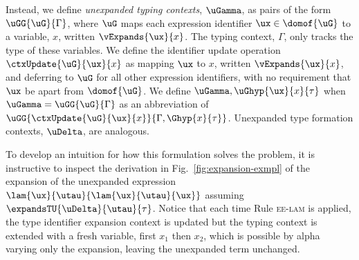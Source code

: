 \documentclass[acmsmall]{acmart}
\begin{document}
Instead, we define \emph{unexpanded typing contexts}, $\uGamma$, as pairs of the form $\uGG{\uG}{\Gamma}$, where $\uG$ maps each expression identifier $\ux \in \domof{\uG}$ to a variable, $x$, written $\vExpands{\ux}{x}$. The typing context, $\Gamma$, only tracks the type of these variables. We define the identifier update operation $\ctxUpdate{\uG}{\ux}{x}$ as mapping $\ux$ to $x$, written $\vExpands{\ux}{x}$, and deferring to $\uG$ for all other expression identifiers, with no requirement that $\ux$ be apart from $\domof{\uG}$. %
We define $\uGamma, \uGhyp{\ux}{x}{\tau}$ when $\uGamma = \uGG{\uG}{\Gamma}$ as an abbreviation of $\uGG{\ctxUpdate{\uG}{\ux}{x}}{\Gamma, \Ghyp{x}{\tau}}$. Unexpanded type formation contexts, $\uDelta$, are analogous. 

To develop an intuition for how this formulation solves the problem, it is instructive to inspect the derivation in Fig.~\ref{fig:expansion-exmpl} of the expansion of the unexpanded expression $\lam{\ux}{\utau}{\lam{\ux}{\utau}{\ux}}$ assuming $\expandsTU{\uDelta}{\utau}{\tau}$. Notice that each time Rule \textsc{ee-lam} is applied, the type identifier expansion context is updated but the typing context is extended with a fresh variable, first $x_1$ then $x_2$, which is possible by alpha varying only the expansion, leaving the unexpanded term unchanged. %

\end{document}
